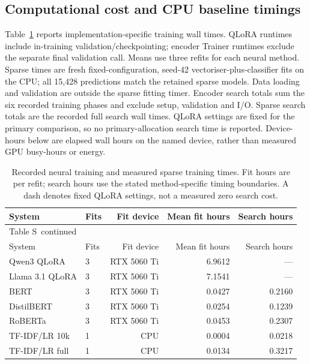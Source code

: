 \documentclass[10pt,a4paper]{article}
\renewcommand{\thetable}{S\arabic{table}}
\begin{document}
\subsection{Computational cost and CPU baseline timings}
Table~\ref{sup:training-costs} reports implementation-specific training wall times. QLoRA runtimes include in-training validation/checkpointing; encoder Trainer runtimes exclude the separate final validation call. Means use three refits for each neural method. Sparse times are fresh fixed-configuration, seed-42 vectoriser-plus-classifier fits on the CPU; all 15,428 predictions match the retained sparse models. Data loading and validation are outside the sparse fitting timer. Encoder search totals sum the six recorded training phases and exclude setup, validation and I/O. Sparse search totals are the recorded full search wall times. QLoRA settings are fixed for the primary comparison, so no primary-allocation search time is reported. Device-hours below are elapsed wall hours on the named device, rather than measured GPU busy-hours or energy.


{\small
\setlength{\tabcolsep}{4pt}
\begin{longtable}{@{}llrrr@{}}
\caption{Recorded neural training and measured sparse training times. Fit hours are per refit; search hours use the stated method-specific timing boundaries. A dash denotes fixed QLoRA settings, not a measured zero search cost.}\label{sup:training-costs}\\
\toprule
System & Fits & Fit device & Mean fit hours & Search hours \\
\midrule\endfirsthead
\multicolumn{5}{l}{\small Table \thetable\ continued}\\
\toprule
System & Fits & Fit device & Mean fit hours & Search hours \\
\midrule\endhead
\bottomrule\endfoot
Qwen3 QLoRA & 3 & RTX 5060 Ti & 6.9612 & --- \\
Llama 3.1 QLoRA & 3 & RTX 5060 Ti & 7.1541 & --- \\
BERT & 3 & RTX 5060 Ti & 0.0427 & 0.2160 \\
DistilBERT & 3 & RTX 5060 Ti & 0.0254 & 0.1239 \\
RoBERTa & 3 & RTX 5060 Ti & 0.0453 & 0.2307 \\
TF-IDF/LR 10k & 1 & CPU & 0.0004 & 0.0218 \\
TF-IDF/LR full & 1 & CPU & 0.0134 & 0.3217 \\
\end{longtable}
}
\end{document}
